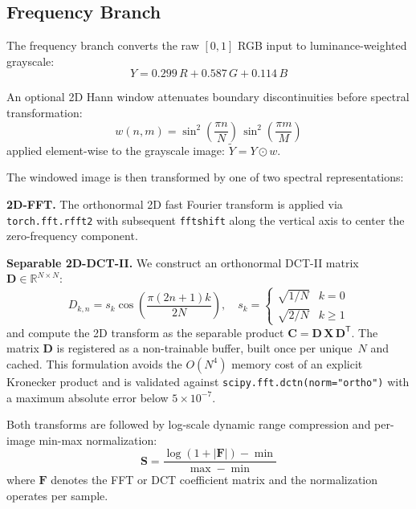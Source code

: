 \documentclass[conference]{IEEEtran}
\begin{document}
\subsection{Frequency Branch}

The frequency branch converts the raw $[0, 1]$ RGB input to luminance-weighted grayscale:
\begin{equation}
\label{eq:grayscale}
Y = 0.299\,R + 0.587\,G + 0.114\,B
\end{equation}

An optional 2D Hann window attenuates boundary discontinuities before spectral transformation:
\begin{equation}
\label{eq:hann}
w(n, m) = \sin^2\!\left(\frac{\pi n}{N}\right)\,\sin^2\!\left(\frac{\pi m}{M}\right)
\end{equation}
applied element-wise to the grayscale image: $\tilde{Y} = Y \odot w$.

The windowed image is then transformed by one of two spectral representations:

\textbf{2D-FFT.} The orthonormal 2D fast Fourier transform is applied via \texttt{torch.fft.rfft2} with subsequent \texttt{fftshift} along the vertical axis to center the zero-frequency component.

\textbf{Separable 2D-DCT-II.} We construct an orthonormal DCT-II matrix $\mathbf{D} \in \mathbb{R}^{N \times N}$:
\begin{equation}
\label{eq:dct}
D_{k,n} = s_k \cos\!\left(\frac{\pi(2n+1)k}{2N}\right), \quad s_k = \begin{cases} \sqrt{1/N} & k = 0 \\ \sqrt{2/N} & k \geq 1 \end{cases}
\end{equation}
and compute the 2D transform as the separable product $\mathbf{C} = \mathbf{D}\,\mathbf{X}\,\mathbf{D}^\mathsf{T}$. The matrix $\mathbf{D}$ is registered as a non-trainable buffer, built once per unique~$N$ and cached. This formulation avoids the $O(N^4)$ memory cost of an explicit Kronecker product and is validated against \texttt{scipy.fft.dctn(norm="ortho")} with a maximum absolute error below $5 \times 10^{-7}$.

Both transforms are followed by log-scale dynamic range compression and per-image min-max normalization:
\begin{equation}
\label{eq:logspec}
\mathbf{S} = \frac{\log(1 + |\mathbf{F}|) - \min}{\max - \min}
\end{equation}
where $\mathbf{F}$ denotes the FFT or DCT coefficient matrix and the normalization operates per sample.
\end{document}
